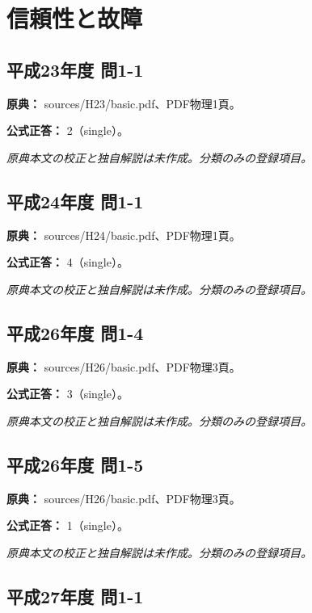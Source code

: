 \section{信頼性と故障}

\subsection{平成23年度 問1-1}
\label{q:h23-reg-basic-1-1}

\noindent\textbf{原典：} sources/H23/basic.pdf、PDF物理1頁。

\textbf{公式正答：} 2（single）。

\par\textit{原典本文の校正と独自解説は未作成。分類のみの登録項目。}

\subsection{平成24年度 問1-1}
\label{q:h24-reg-basic-1-1}

\noindent\textbf{原典：} sources/H24/basic.pdf、PDF物理1頁。

\textbf{公式正答：} 4（single）。

\par\textit{原典本文の校正と独自解説は未作成。分類のみの登録項目。}

\subsection{平成26年度 問1-4}
\label{q:h26-reg-basic-1-4}

\noindent\textbf{原典：} sources/H26/basic.pdf、PDF物理3頁。

\textbf{公式正答：} 3（single）。

\par\textit{原典本文の校正と独自解説は未作成。分類のみの登録項目。}

\subsection{平成26年度 問1-5}
\label{q:h26-reg-basic-1-5}

\noindent\textbf{原典：} sources/H26/basic.pdf、PDF物理3頁。

\textbf{公式正答：} 1（single）。

\par\textit{原典本文の校正と独自解説は未作成。分類のみの登録項目。}

\subsection{平成27年度 問1-1}
\label{q:h27-reg-basic-1-1}

